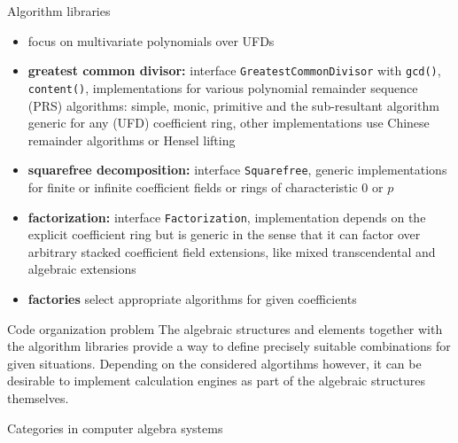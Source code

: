 \documentclass[final]{beamer}
\newcommand{\code}[1]{\texttt{#1}}
\begin{document}
\begin{frame}[fragile]
\begin{columns}[t]
\begin{column}{.3\linewidth}
  \begin{block}{\large Algorithm libraries}
  \scriptsize 
  \begin{itemize}
  \item focus on multivariate polynomials over UFDs
  \item \textbf{greatest common divisor:} 
        interface \code{Greatest\-Common\-Divisor} with \code{gcd()}, \code{content()}, 
        implementations for various polynomial remainder sequence (PRS) algorithms: 
        simple, monic, primitive and the sub-resultant algorithm 
        generic for any (UFD) coefficient ring,
        other implementations use Chinese remainder algorithms or Hensel lifting
  \item \textbf{squarefree decomposition:} 
        interface \code{Square\-free}, 
        generic implementations for finite or infinite coefficient fields 
        or rings of characteristic $0$ or $p$
  \item \textbf{factorization:} 
        interface \code{Factorization}, 
        implementation depends on the explicit coefficient ring 
        but is generic in the sense that it can factor
        over arbitrary stacked coefficient field extensions, like mixed
        transcendental and algebraic extensions
  \item \textbf{factories} select appropriate algorithms for given coefficients
  \end{itemize}
  \end{block}
  \hfill
  \begin{block}{\large Code organization problem}
  \scriptsize
The algebraic structures and elements together with the algorithm
libraries provide a way to define precisely suitable combinations
for given situations. Depending on the considered algortihms however,
it can be desirable to implement calculation engines as part of the
algebraic structures themselves.
  \end{block}
  \hfill
  \begin{block}{\large Categories in computer algebra systems}
  \scriptsize
  \begin{enumerate}

\end{enumerate}
\end{block}
\end{column}
\end{columns}
\end{frame}
\end{document}
